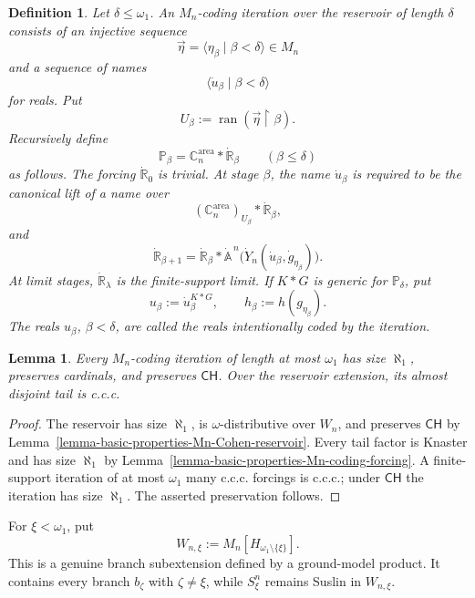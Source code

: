 \documentclass[a4paper,11pt]{article}
\newtheorem{lemma}[theorem]{Lemma}
\newtheorem{definition}[theorem]{Definition}
\newcommand{\forceP}{\mathbb{P}}
\newcommand{\forceR}{\mathbb{R}}
\newcommand{\forceC}{\mathbb{C}}
\newcommand{\CH}{\mathsf{CH}}
\begin{document}
\begin{definition}
\label{definition-Mn-coding-iteration}
Let $\delta\leq\omega_1$.  An \emph{$M_n$-coding iteration over the
reservoir of length $\delta$} consists of an injective sequence
\[
   \vec\eta=\langle\eta_\beta\mid\beta<\delta\rangle\in M_n
\]
and a sequence of  names
\[
   \langle\dot u_\beta\mid\beta<\delta\rangle
\]
for reals.  Put
\[
   U_\beta:=\operatorname{ran}
      (\vec\eta\restriction\beta).
\]
Recursively define
\[
   \forceP_\beta
   =\forceC^{\mathrm{area}}_n*\dot{\forceR}_\beta
   \qquad(\beta\leq\delta)
\]
as follows.  The forcing $\dot{\forceR}_0$ is trivial.  At stage $\beta$,
the name $\dot u_\beta$ is required to be the canonical lift of a name over
\[
   (\forceC^{\mathrm{area}}_n)_{U_\beta}
      *\dot{\forceR}_\beta,
\]
and
\[
   \dot{\forceR}_{\beta+1}
   =\dot{\forceR}_\beta*
      \dot{\mathbb A}^{\,n}
      \bigl(\dot Y_n(\dot u_\beta,
                      \dot g_{\eta_\beta})\bigr).
\]
At limit stages, $\dot{\forceR}_\lambda$ is the finite-support limit.  If
$K*G$ is generic for $\forceP_\delta$, put
\[
   u_\beta:=\dot u_\beta^{K*G},
   \qquad
   h_\beta:=h(g_{\eta_\beta}).
\]
The reals $u_\beta$, $\beta<\delta$, are called the reals
\emph{intentionally coded} by the iteration.
\end{definition}

\begin{lemma}
\label{lemma-size-preservation-Mn-coding-iterations}
Every $M_n$-coding iteration of length at most $\omega_1$ has size
$\aleph_1$, preserves cardinals, and preserves $\CH$.  Over the reservoir
extension, its almost disjoint tail is c.c.c.
\end{lemma}

\begin{proof}
The reservoir has size $\aleph_1$, is $\omega$-distributive over $W_n$, and
preserves $\CH$ by
Lemma~\ref{lemma-basic-properties-Mn-Cohen-reservoir}.  Every tail factor is
Knaster and has size $\aleph_1$ by
Lemma~\ref{lemma-basic-properties-Mn-coding-forcing}.  A finite-support
iteration of at most $\omega_1$ many c.c.c. forcings is c.c.c.; under $\CH$
the iteration has size $\aleph_1$.  The asserted preservation follows.
\end{proof}

For $\xi<\omega_1$, put
\[
   W_{n,\xi}
   :=M_n[H_{\omega_1\setminus\{\xi\}}].
\]
This is a genuine branch subextension defined by a ground-model product.  It
contains every branch $b_\zeta$ with $\zeta\neq\xi$, while $S^n_\xi$ remains
Suslin in $W_{n,\xi}$.
\end{document}
